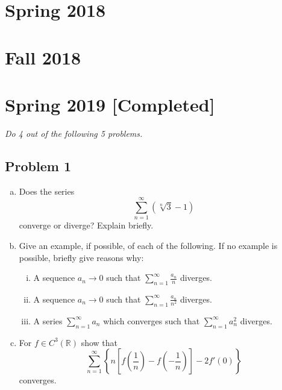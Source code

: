 \documentclass[12pt]{article}
\newcommand{\real}{\mathbb{R}}
\newcommand{\ita}[1]{\textit{#1}}
\newcommand\paren[1]{\left( #1 \right)}
\newcommand\setb[1]{\left \{ #1 \right \}}
\newcommand{\sqbrack}[1]{\left [ #1 \right ]}
\theoremstyle{definition}
\begin{document}
\newpage 
\section{Spring 2018}

\newpage 
\section{Fall 2018}

\newpage
\section{Spring 2019 [Completed]}
\ita{Do 4 out of the following 5 problems.}
\subsection{Problem 1 \texorpdfstring{\cite{Christian}}{}}
\begin{enumerate}[(a)]
    \item Does the series
    \[
        \sum\limits_{n = 1}^{\infty} \paren{ \sqrt[n]{3} - 1 }
    \]
    converge or diverge? Explain briefly. 
    \item Give an example, if possible, of each of the following. If no example is possible, briefly give reasons why: 
    \begin{enumerate}[i.]
        \item A sequence $a_n \to 0$ such that $\sum\limits_{n = 1}^{\infty} \frac{a_n}{n}$ diverges. 
        \item A sequence $a_n \to 0$ such that $\sum\limits_{n = 1}^{\infty} \frac{a_n}{n^2}$ diverges. 
        \item A series $\sum\limits_{n = 1}^{\infty} a_n$ which converges such that $\sum\limits_{n = 1}^{\infty} a_n^2$ diverges. 
    \end{enumerate}
    \item For $f \in C^3(\real)$ show that 
    \[
        \sum\limits_{n = 1}^{\infty} \setb{ n \sqbrack{ f \paren{ \frac{1}{n} } - f \paren{ -\frac{1}{n} } } - 2 f'(0) }
    \]
    converges. 
\end{enumerate}
\end{document}
